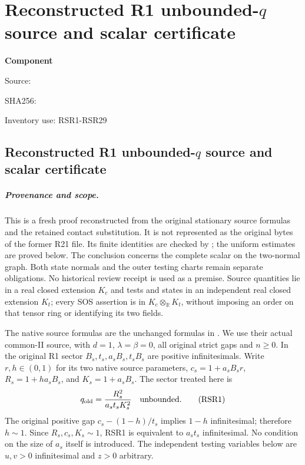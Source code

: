 \chapter{Reconstructed R1 unbounded-$q$ source and scalar certificate}
\label{component:p9e725a065583}
\noindent\textbf{Component }\par
{\small\noindent Source: \par}
{\small\noindent SHA256: \par}
{\small\noindent Inventory use: RSR1-RSR29\par}
\medskip
\section{Reconstructed R1 unbounded-$q$ source and scalar certificate}
\label{p9e725a065583:sec:reconstructed-r1-qo-source-scalar}

\paragraph{Provenance and scope.}
This is a fresh proof reconstructed from the original stationary source
formulas and the retained contact substitution. It is not represented as
the original bytes of the former R21 file. Its finite identities are
checked by ; the uniform estimates
are proved below. The conclusion concerns the complete scalar on the
two-normal graph. Both state normals and the outer testing charts remain
separate obligations. No historical review receipt is used as a premise.
Source quantities lie in a real closed extension $K_c$ and tests and
states in an independent real closed extension $K_t$; every SOS assertion
is in $K_c\otimes_{\mathbb R}K_t$, without imposing an order on that
tensor ring or identifying its two fields.

The native source formulas are the unchanged formulas in
. We use their actual common-II
source, with $d=1$, $\lambda=\beta=0$, all original strict gaps and
$n\geq0$. In the original R1 sector $B_s,t_s,a_sB_s,t_sB_s$ are
positive infinitesimals. Write $r,h\in(0,1)$ for its two native source
parameters, $c_s=1+a_sB_sr$, $R_s=1+ha_sB_s$, and $K_s=1+a_sB_s$.
The sector treated here is
\[
 q_{\rm old}=\frac{R_s^2}{a_st_sK_s^2}\quad\hbox{unbounded}.
 \tag{RSR1}
\]
The original positive gap $c_s-(1-h)/t_s$ implies $1-h$ infinitesimal;
therefore $h\sim1$. Since $R_s,c_s,K_s\sim1$, RSR1 is equivalent to
$a_st_s$ infinitesimal. No condition on the size of $a_s$ itself is
introduced. The independent testing variables below are $u,v>0$
infinitesimal and $z>0$ arbitrary.

